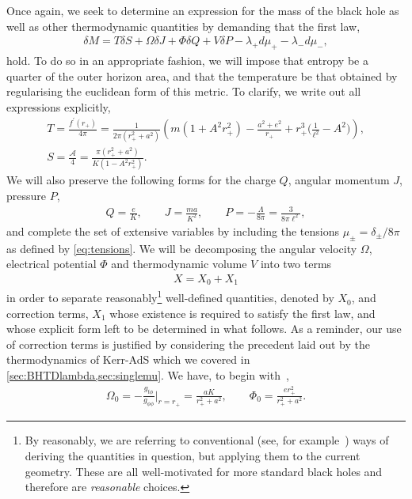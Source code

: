 \documentclass[
twoside,
openright,
frontopenright,
]{dmathesis}
\newcommand{\nn}{\nonumber}
\begin{document}
Once again, we seek to determine an expression for the mass of the black hole as
well as other thermodynamic quantities by demanding that the first law,
\begin{align}
  \label{eq:fullFLT}
  \delta M = T\delta S + \Omega \delta J + \Phi \delta Q + V \delta P  - \lambda_+
  d\mu_+ - \lambda_- d\mu_-,
\end{align}
hold. To do so in an appropriate fashion, we will impose that entropy be a
quarter of the outer horizon area, and that the temperature be that obtained by
regularising the euclidean form of this metric. To clarify, we write out all
expressions explicitly,
\begin{gather}
  T= \frac{f^\prime (r_+)}{4\pi} = \frac{1}{2\pi(r_+^2+a^2)}\left(m(1+A^2r_+^2)
    - \frac{a^2+e^2}{r_+}+r_+^3\Big(\frac{1}{\ell^2}-A^2\Big)\right), \nn\\ 
  S = \frac{\mathcal{A}}{4} = \frac{\pi(r_+^2+a^2)}{K(1-A^2 r_+^2)}.
  \label{eq:TS}
\end{gather}
We will also preserve the following forms for the charge $Q$, angular momentum
$J$, pressure $P$,
\begin{gather}
  \label{eq:QJP} Q=\frac{e}{K}, \qquad J = \frac{m a}{K^2}, \qquad P =
  -\frac{\Lambda}{8\pi} = \frac{3}{8\pi \ell^2},
\end{gather}
and complete the set of extensive variables by including the tensions
$\mu_\pm=\delta_\pm/8\pi$ as defined by \cref{eq:tensions}. We will be
decomposing the angular velocity $\Omega$, electrical potential $\Phi$ and
thermodynamic volume $V$ into two terms
\begin{align}
  \label{eq:X}
  X=X_0+X_1 
\end{align}
in order to separate reasonably\footnote{By reasonably, we are referring to
  conventional (see, for example~\cite{Gibbons:2004ai}) ways of deriving the
  quantities in question, but applying them to the current geometry. These are
  all well-motivated for more standard black holes and therefore are
  \emph{reasonable} choices.} well-defined quantities, denoted by $X_0$, and
correction terms, $X_1$ whose existence is required to satisfy the first law,
and whose explicit form left to be determined in what follows. As a reminder,
our use of correction terms is justified by considering the precedent laid out
by the thermodynamics of Kerr-AdS \cite{Caldarelli:1999xj,Gibbons:2004ai} which
we covered in \cref{sec:BHTDlambda,sec:singlemu}. We have, to begin
with~\cite{Caldarelli:1999xj},
\begin{gather}\label{eq:OP0}
\Omega_0 = -\frac{g_{t\phi}}{g_{\phi\phi}}\bigg|_{r=r_+} = \frac{a
  K}{r_+^2+a^2}, \qquad \Phi_0 = \frac{e r_+^2}{r_+^2+a^2}. 
\end{gather}
\end{document}
